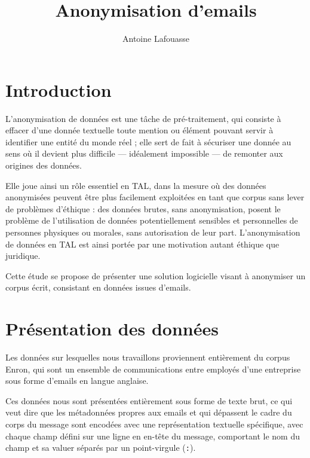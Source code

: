 \documentclass[11pt]{article}
\title{Anonymisation d'emails}
\author{Antoine Lafouasse}
\begin{document}
\maketitle

\section*{Introduction}

L'anonymisation de données est une tâche de pré-traitement, qui consiste à
effacer d'une donnée textuelle toute mention ou élément pouvant servir à
identifier une entité du monde réel ; elle sert de fait à sécuriser une donnée
au sens où il devient plus difficile --- idéalement impossible --- de remonter
aux origines des données.

Elle joue ainsi un rôle essentiel en TAL, dans la mesure où des données
anonymisées peuvent être plus facilement exploitées en tant que corpus sans
lever de problèmes d'éthique : des données brutes, sans anonymisation, posent
le problème de l'utilisation de données potentiellement sensibles et
personnelles de personnes physiques ou morales, sans autorisation de leur part.
L'anonymisation de données en TAL est ainsi portée par une motivation autant
éthique que juridique.

Cette étude se propose de présenter une solution logicielle visant à anonymiser
un corpus écrit, consistant en données issues d'emails.

\section{Présentation des données}

Les données sur lesquelles nous travaillons proviennent entièrement du corpus
Enron, qui sont un ensemble de communications entre employés d'une entreprise
sous forme d'emails en langue anglaise.

Ces données nous sont présentées entièrement sous forme de texte brut, ce qui
veut dire que les métadonnées propres aux emails et qui dépassent le cadre du
corps du message sont encodées avec une représentation textuelle spécifique,
avec chaque champ défini sur une ligne en en-tête du message, comportant le
nom du champ et sa valuer séparés par un point-virgule (\texttt{:}).
\end{document}
